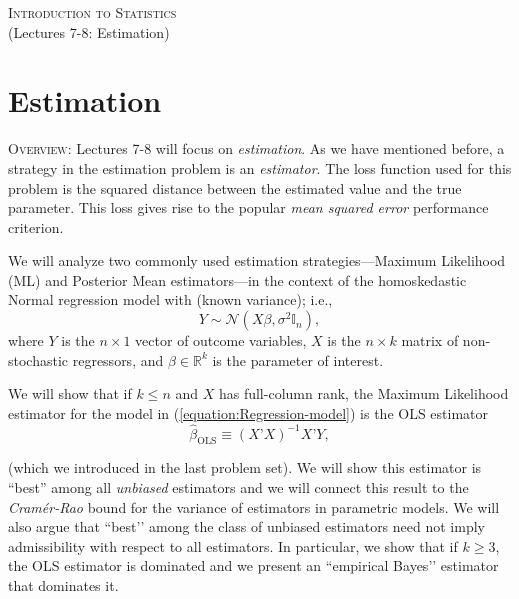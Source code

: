 \documentclass[11pt]{article} %
\begin{document}
\onehalfspace

\vspace*{\fill}
\begingroup
\centering

\Large {\scshape Introduction to Statistics}\\

(Lectures 7-8: Estimation)

\endgroup
\vspace*{\fill}

\newpage


\section{Estimation}

{\scshape Overview:} \noindent Lectures 7-8 will focus on \emph{estimation}. As we have mentioned before, a strategy in the estimation problem is an \emph{estimator}. The loss function used for this problem is the squared distance between the estimated value and the true parameter. This loss gives rise to the popular \emph{mean squared error} performance criterion. 



We will analyze two commonly used estimation strategies---Maximum Likelihood (ML) and Posterior Mean estimators---in the context of the homoskedastic Normal regression model with (known variance); i.e., 
\begin{equation} \label{equation:Regression-model}
Y \sim \mathcal{N}(X \beta, \sigma^2 \mathbb{I}_n ), 
\end{equation}
 where $Y$ is the $n \times 1$ vector of outcome variables, $X$ is the $n \times k$ matrix of non-stochastic regressors, and $\beta \in \mathbb{R}^{k}$ is the parameter of interest. 
 
 We will show that if $k \leq n$ and $X$ has full-column rank, the Maximum Likelihood estimator for the model in (\ref{equation:Regression-model}) is the OLS estimator
\[ \widehat{\beta}_{\textrm{OLS}} \equiv (X’X)^{-1} X’Y,  \]

\noindent (which we introduced in the last problem set). We will show this estimator is ``best'' among all \emph{unbiased} estimators and we will connect this result to the \emph{Cram\'er-Rao} bound for the variance of estimators in parametric models. We will also argue that ``best’’ among the class of unbiased estimators need not imply admissibility with respect to all estimators. In particular, we show that if $k \geq 3$, the OLS estimator is dominated and we present an ``empirical Bayes’’ estimator that dominates it.   
\end{document}
